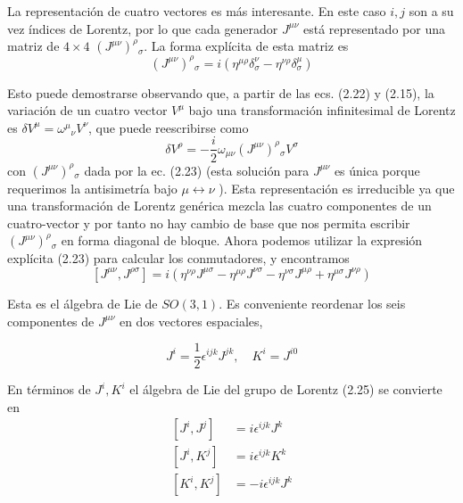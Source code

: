 La representación de cuatro vectores es más interesante. En este caso $i, j$ son a su vez índices de Lorentz, por lo que cada generador $J^{\mu \nu}$ está representado por una matriz de $4 \times 4$ $\left(J^{\mu \nu}\right)^{\rho}{ }_{\sigma}$. La forma explícita de esta matriz es
\begin{equation*}
  \left(J^{\mu \nu}\right)^{\rho}{ }_{\sigma}=i\left(\eta^{\mu \rho} \delta_{\sigma}^{\nu}-\eta^{\nu \rho} \delta_{\sigma}^{\mu}\right) \tag{2.23}
  \end{equation*}

  Esto puede demostrarse observando que, a partir de las ecs. (2.22) y (2.15), la variación de un cuatro vector $V^{\mu}$ bajo una transformación infinitesimal de Lorentz es $\delta V^{\mu}=\omega^{\mu}{ }_{\nu} V^{\nu}$, que puede reescribirse como
  \begin{equation*}
    \delta V^{\rho}=-\frac{i}{2} \omega_{\mu \nu}\left(J^{\mu \nu}\right)^{\rho}{ }_{\sigma} V^{\sigma} \tag{2.24}
    \end{equation*}
    con $\left(J^{\mu \nu}\right)^{\rho}{ }_{\sigma}$ dada por la ec. (2.23) (esta solución para $J^{\mu \nu}$ es única porque requerimos la antisimetría bajo $\mu \leftrightarrow \nu$ ). Esta representación es irreducible ya que una transformación de Lorentz genérica mezcla las cuatro componentes de un cuatro-vector y por tanto no hay cambio de base que nos permita escribir $\left(J^{\mu \nu}\right)^{\rho}{ }_{\sigma}$ en forma diagonal de bloque. Ahora podemos utilizar la expresión explícita (2.23) para calcular los conmutadores, y encontramos
    \begin{equation*}
      \left[J^{\mu \nu}, J^{\rho \sigma}\right]=i\left(\eta^{\nu \rho} J^{\mu \sigma}-\eta^{\mu \rho} J^{\nu \sigma}-\eta^{\nu \sigma} J^{\mu \rho}+\eta^{\mu \sigma} J^{\nu \rho}\right) \tag{2.25}
      \end{equation*}

      Esta es el álgebra de Lie de $S O(3,1)$. Es conveniente reordenar los seis componentes de $J^{\mu \nu}$ en dos vectores espaciales,

      \begin{equation*}
        J^{i}=\frac{1}{2} \epsilon^{i j k} J^{j k}, \quad K^{i}=J^{i 0} \tag{2.26}
        \end{equation*}

        En términos de $J^{i}, K^{i}$ el álgebra de Lie del grupo de Lorentz (2.25) se convierte en
        \begin{align*}
          {\left[J^{i}, J^{j}\right] } & =i \epsilon^{i j k} J^{k}  \tag{2.27}\\
          {\left[J^{i}, K^{j}\right] } & =i \epsilon^{i j k} K^{k}  \tag{2.28}\\
          {\left[K^{i}, K^{j}\right] } & =-i \epsilon^{i j k} J^{k} \tag{2.29}
          \end{align*}


